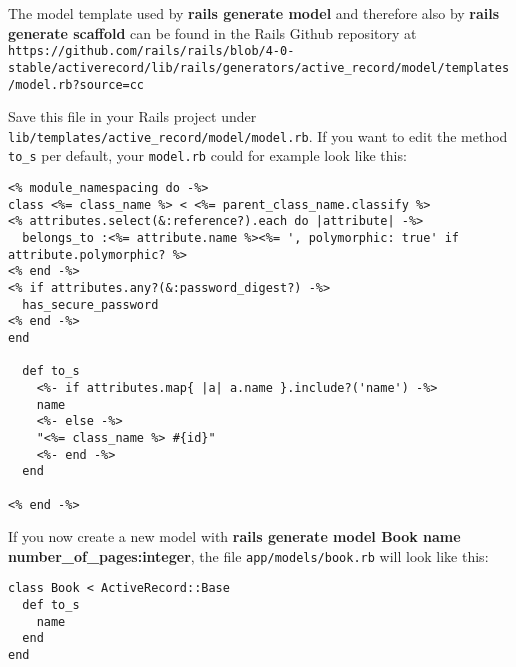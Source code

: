 \documentclass[a4paper]{book}
\newcounter{tab}[chapter]
\begin{document}
The model template used by \textbf{rails generate model} and therefore also by \textbf{rails generate scaffold} can be found in the Rails Github repository at \texttt{https://github.com/rails/rails/blob/4-0-stable/activerecord/lib/rails/generators/active\_record/model/templates/model.rb?source=cc}

Save this file in your Rails project under \texttt{lib/templates/active\_record/model/model.rb}. If you want to edit the method \texttt{to\_s} per default, your \texttt{model.rb} could for example look like this:

\begin{shaded}\begin{verbatim}
<% module_namespacing do -%>
class <%= class_name %> < <%= parent_class_name.classify %>
<% attributes.select(&:reference?).each do |attribute| -%>
  belongs_to :<%= attribute.name %><%= ', polymorphic: true' if attribute.polymorphic? %>
<% end -%>
<% if attributes.any?(&:password_digest?) -%>
  has_secure_password
<% end -%>
end

  def to_s
    <%- if attributes.map{ |a| a.name }.include?('name') -%>
    name
    <%- else -%>
    "<%= class_name %> #{id}"
    <%- end -%>
  end

<% end -%>
\end{verbatim}\end{shaded}

If you now create a new model with \textbf{rails generate model Book name number\_of\_pages:integer}, the file \texttt{app/models/book.rb} will look like this:

\begin{shaded}\begin{verbatim}
class Book < ActiveRecord::Base
  def to_s
    name
  end
end
\end{verbatim}\end{shaded}
\end{document}
